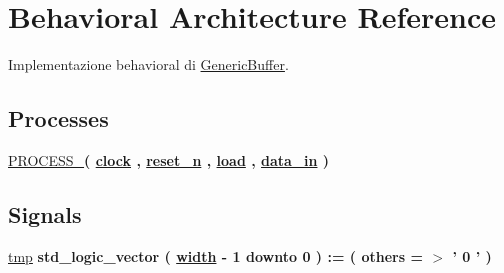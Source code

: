 \hypertarget{class_generic_buffer_1_1_behavioral}{\section{Behavioral Architecture Reference}
\label{class_generic_buffer_1_1_behavioral}
}


Implementazione behavioral di \hyperlink{class_generic_buffer}{Generic\+Buffer}.  


\subsection*{Processes}
 \begin{DoxyCompactItemize}
\item 
\hyperlink{group___generic_buffer_ga2ee480e118ca2b3fccf26139a66e84ad}{P\+R\+O\+C\+E\+S\+S\+\_}{\bfseries  ( {\bfseries {\bfseries \hyperlink{group___generic_buffer_gadfc2d5e995e9c6876b2e55bf6a5c4071}{clock}} \textcolor{vhdlchar}{ }} , {\bfseries {\bfseries \hyperlink{group___generic_buffer_ga446ea52ed8c4a84181a47d9165ce41a5}{reset\+\_\+n}} \textcolor{vhdlchar}{ }} , {\bfseries {\bfseries \hyperlink{group___generic_buffer_gaba761f7740d0b6257a0e283b3734ddbf}{load}} \textcolor{vhdlchar}{ }} , {\bfseries {\bfseries \hyperlink{group___generic_buffer_ga597910698848749da5951285c85fa4f9}{data\+\_\+in}} \textcolor{vhdlchar}{ }} )}
\end{DoxyCompactItemize}
\subsection*{Signals}
 \begin{DoxyCompactItemize}
\item 
\hyperlink{group___generic_buffer_gab94e66105790803865249c33633e359f}{tmp} {\bfseries \textcolor{vhdlchar}{std\+\_\+logic\+\_\+vector}\textcolor{vhdlchar}{ }\textcolor{vhdlchar}{(}\textcolor{vhdlchar}{ }\textcolor{vhdlchar}{ }\textcolor{vhdlchar}{ }\textcolor{vhdlchar}{ }{\bfseries \hyperlink{group___generic_buffer_gae47d961480346c1d82439a66505e6e7d}{width}} \textcolor{vhdlchar}{-\/}\textcolor{vhdlchar}{ } \textcolor{vhdldigit}{1} \textcolor{vhdlchar}{ }\textcolor{vhdlchar}{downto}\textcolor{vhdlchar}{ }\textcolor{vhdlchar}{ } \textcolor{vhdldigit}{0} \textcolor{vhdlchar}{ }\textcolor{vhdlchar}{)}\textcolor{vhdlchar}{ }\textcolor{vhdlchar}{ }\textcolor{vhdlchar}{ }\textcolor{vhdlchar}{\+:}\textcolor{vhdlchar}{=}\textcolor{vhdlchar}{ }\textcolor{vhdlchar}{(}\textcolor{vhdlchar}{ }\textcolor{vhdlchar}{ }\textcolor{vhdlchar}{others}\textcolor{vhdlchar}{ }\textcolor{vhdlchar}{ }\textcolor{vhdlchar}{=}\textcolor{vhdlchar}{ }\textcolor{vhdlchar}{$>$}\textcolor{vhdlchar}{ }\textcolor{vhdlchar}{'}\textcolor{vhdlchar}{ } \textcolor{vhdldigit}{0} \textcolor{vhdlchar}{ }\textcolor{vhdlchar}{'}\textcolor{vhdlchar}{ }\textcolor{vhdlchar}{)}\textcolor{vhdlchar}{ }} 
\end{DoxyCompactItemize}


